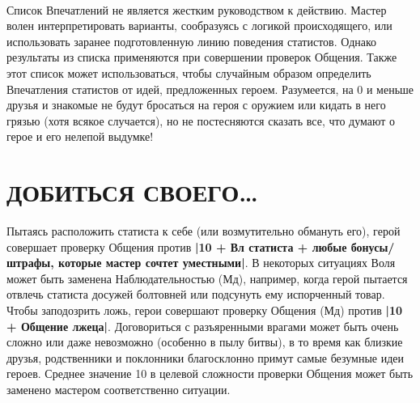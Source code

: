 \paragraph{}
Список Впечатлений не является жестким руководством к действию. Мастер волен интерпретировать варианты, сообразуясь с логикой происходящего, или использовать заранее подготовленную линию поведения статистов. Однако результаты из списка применяются при совершении проверок Общения.
\newline
Также этот список может использоваться, чтобы случайным образом определить Впечатления статистов от идей, предложенных героем. Разумеется, на 0 и меньше друзья и знакомые не будут бросаться на героя с оружием или кидать в него грязью (хотя всякое случается), но не постесняются сказать все, что думают о герое и его нелепой выдумке!
\section{ДОБИТЬСЯ СВОЕГО…}
Пытаясь расположить статиста к себе (или возмутительно обмануть его), герой совершает проверку Общения против \textbf{|10 + Вл статиста + любые бонусы/штрафы, которые мастер сочтет уместными|}. В некоторых ситуациях Воля может быть заменена Наблюдательностью (Мд), например, когда герой пытается отвлечь статиста досужей болтовней или подсунуть ему испорченный товар. Чтобы заподозрить ложь, герои совершают проверку Общения (Мд) против \textbf{|10 + Общение лжеца|}. Договориться с разъяренными врагами может быть очень сложно или даже невозможно (особенно в пылу битвы), в то время как близкие друзья, родственники и поклонники благосклонно примут самые безумные идеи героев. Среднее значение 10 в целевой сложности проверки Общения может быть заменено мастером соответственно ситуации.

